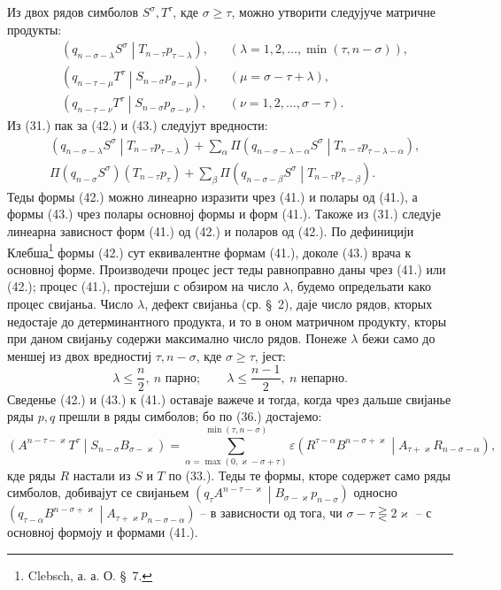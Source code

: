 \documentclass[11pt]{article}
\newcommand{\pair}[2]{\left(#1\middle|#2\right)}
\newcommand{\eps}{\varepsilon}
\begin{document}
Из двох рядов симболов $S^\sigma,T^\tau$, кде $\sigma\ge\tau$, можно утворити следујуче матричне продукты:
\begin{align}
&\pair{q_{n-\sigma-\lambda}S^\sigma}{T_{n-\tau}p_{\tau-\lambda}},
&&(\lambda=1,2,\ldots,\min(\tau,n-\sigma)),\tag{41}\\
&\pair{q_{n-\tau-\mu}T^\tau}{S_{n-\sigma}p_{\sigma-\mu}},
&&(\mu=\sigma-\tau+\lambda),\tag{42}\\
&\pair{q_{n-\tau-\nu}T^\tau}{S_{n-\sigma}p_{\sigma-\nu}},
&&(\nu=1,2,\ldots,\sigma-\tau).
\tag{43}
\end{align}
Из (31.) пак за (42.) и (43.) следујут вредности:
\begin{align}
&\pair{q_{n-\sigma-\lambda}S^\sigma}{T_{n-\tau}p_{\tau-\lambda}}
 +\sum_{\alpha}\Pi
 \pair{q_{n-\sigma-\lambda-\alpha}S^\sigma}
 {T_{n-\tau}p_{\tau-\lambda-\alpha}},\tag{42a}\\
&\Pi(q_{n-\sigma}S^\sigma)(T_{n-\tau}p_\tau)
 +\sum_{\beta}\Pi
 \pair{q_{n-\sigma-\beta}S^\sigma}{T_{n-\tau}p_{\tau-\beta}}.
\tag{43a}
\end{align}
Теды формы (42.) можно линеарно изразити чрез (41.) и полары од (41.), а формы (43.) чрез полары основној формы и форм (41.). Такоже из (31.) следује линеарна зависност форм (41.) од (42.) и поларов од (42.). По дефиницији Клебша\footnote{Clebsch, а. а. О. \S\ 7.} формы (42.) сут еквивалентне формам (41.), доколе (43.) врача к основној форме. Производечи процес јест теды равноправно даны чрез (41.) или (42.); процес (41.), простејши с обзиром на число $\lambda$, будемо определьати како процес свијаньа. Число $\lambda$, дефект свијаньа (ср. \S\ 2), даје число рядов, кторых недостаје до детерминантного продукта, и то в оном матричном продукту, кторы при даном свијаньу содержи максимално число рядов. Понеже $\lambda$ бежи само до меншеј из двох вредностиј $\tau,n-\sigma$, кде $\sigma\ge\tau$, јест:
\begin{equation}
 \lambda\le\frac n2,\ n\text{ парно};\qquad
 \lambda\le\frac{n-1}{2},\ n\text{ непарно}.
\tag{44}
\end{equation}
Сведенье (42.) и (43.) к (41.) оставаје важече и тогда, когда чрез дальше свијанье ряды $p,q$ прешли в ряды симболов; бо по (36.) достајемо:
\[
 \pair{A^{n-\tau-\varkappa}T^\tau}{S_{n-\sigma}B_{\sigma-\varkappa}}
 =\sum_{\alpha=\max(0,\varkappa-\sigma+\tau)}^{\min(\tau,n-\sigma)}
 \eps\pair{R^{\tau-\alpha}B^{n-\sigma+\varkappa}}
 {A_{\tau+\varkappa}R_{n-\sigma-\alpha}},
\]
кде ряды $R$ настали из $S$ и $T$ по (33.). Теды те формы, кторе содержет само ряды симболов, добивајут се свијаньем $\pair{q_\tau A^{n-\tau-\varkappa}}{B_{\sigma-\varkappa}p_{n-\sigma}}$ односно $\pair{q_{\tau-\alpha}B^{n-\sigma+\varkappa}}{A_{\tau+\varkappa}p_{n-\sigma-\alpha}}$ -- в зависности од тога, чи $\sigma-\tau\gtreqless 2\varkappa$ -- с основној формоју и формами (41.).
\end{document}
